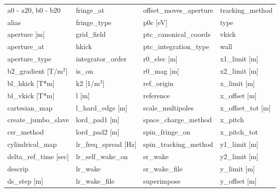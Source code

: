  \begin{tabular}{llll} \toprule
a0 - a20, b0 - b20             & fringe_at                      & offset_moves_aperture          & tracking_method                \\
alias                          & fringe_type                    & p0c [eV]                       & type                           \\
aperture [m]                   & grid_field                     & ptc_canonical_coords           & vkick                          \\
aperture_at                    & hkick                          & ptc_integration_type           & wall                           \\
aperture_type                  & integrator_order               & r0_elec [m]                    & x1_limit [m]                   \\
b2_gradient [T/m$^2$]          & is_on                          & r0_mag [m]                     & x2_limit [m]                   \\
bl_hkick [T*m]                 & k2 [1/m$^3$]                   & ref_origin                     & x_limit [m]                    \\
bl_vkick [T*m]                 & l [m]                          & reference                      & x_offset [m]                   \\
cartesian_map                  & l_hard_edge [m]                & scale_multipoles               & x_offset_tot [m]               \\
create_jumbo_slave             & lord_pad1 [m]                  & space_charge_method            & x_pitch                        \\
csr_method                     & lord_pad2 [m]                  & spin_fringe_on                 & x_pitch_tot                    \\
cylindrical_map                & lr_freq_spread [Hz]            & spin_tracking_method           & y1_limit [m]                   \\
delta_ref_time [sec]           & lr_self_wake_on                & sr_wake                        & y2_limit [m]                   \\
descrip                        & lr_wake                        & sr_wake_file                   & y_limit [m]                    \\
ds_step [m]                    & lr_wake_file                   & superimpose                    & y_offset [m]                   \\

\end{tabular}
